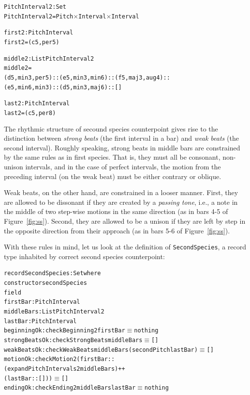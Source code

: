 \begin{alltt}
PitchInterval2 : Set
PitchInterval2 = Pitch \(\times\) Interval \(\times\) Interval

first2 : PitchInterval
first2 = (c 5 , per5)

middle2 : List PitchInterval2
middle2 =
  (d 5 , min3 , per5) :: (e 5 , min3 , min6) :: (f 5 , maj3 , aug4) ::
  (e 5 , min6 , min3) :: (d 5 , min3 , maj6) :: []

last2 : PitchInterval
last2 = (c 5 , per8)
\end{alltt}

The rhythmic structure of secound species counterpoint gives rise to
the distinction between \emph{strong beats} (the first interval in a bar)
and \emph{weak beats} (the second interval).
Roughly speaking, strong beats in middle bars are constrained by the
same rules as in first species.
That is, they must all be consonant, non-unison intervals, and in the 
case of perfect intervals, the motion from the preceding interval (on
the weak beat) must be either contrary or oblique.

Weak beats, on the other hand, are constrained in a looser manner.
First, they are allowed to be dissonant if they are created by a
\emph{passing tone}, i.e., a note in the middle of two step-wise
motions in the same direction (as in bars 4-5 of Figure~\ref{fig:ss}).
Second, they are allowed to be a unison if they are left by step in the
opposite direction from their approach (as in bars 5-6 of Figure~\ref{fig:ss}).

With these rules in mind, let us look at the definition of
\texttt{SecondSpecies}, a record type inhabited by correct second
species counterpoint:

\begin{alltt}
record SecondSpecies : Set where
  constructor secondSpecies
  field
    firstBar      : PitchInterval 
    middleBars    : List PitchInterval2
    lastBar       : PitchInterval 
    beginningOk   : checkBeginning2 firstBar \(\equiv\) nothing
    strongBeatsOk : checkStrongBeats middleBars \(\equiv\) []
    weakBeatsOk   : checkWeakBeats middleBars (secondPitch lastBar) \(\equiv\) []
    motionOk      : checkMotion2 (firstBar ::
                                  (expandPitchIntervals2 middleBars) ++
                                  (lastBar :: [])) \(\equiv\) []
    endingOk      : checkEnding2 middleBars lastBar \(\equiv\) nothing
\end{alltt}

